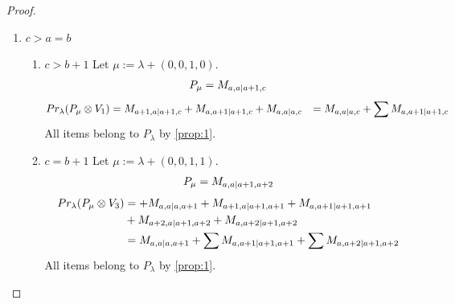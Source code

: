 \documentclass[12pt,a4paper]{article}
\begin{document}
\begin{proof}
\begin{enumerate}
\begin{enumerate}
    \item $a=b+1$
        Let $\mu:=\lambda + (1,1,0,0) $. 
\begin{equation}\notag
  \begin{aligned}
      P_{\mu} =
M_{b+2,b+1|b,c}
  \end{aligned}
\end{equation}
\begin{equation}\notag
  \begin{aligned}
  Pr_{\lambda}(P_\mu \otimes V_6) &=
M_{b+1,b|b,c}
+M_{b+1,b+1|b+1,c}
+M_{b+2,b+1|b+2,c}
  \end{aligned}
\end{equation}
All items belong to $P_\lambda$ by \cref{prop:1}.
  \end{enumerate}

\item $c>a=b$ 
  \begin{enumerate}
    \item $c>b+1$
        Let $\mu:=\lambda + (0,0,1,0) $. 
\begin{equation}\notag
  \begin{aligned}
      P_{\mu} =
M_{a,a|a+1,c}
  \end{aligned}
\end{equation}
\begin{equation}\notag
  \begin{aligned}
  Pr_{\lambda}(P_\mu \otimes V_1) &=
M_{a+1,a|a+1,c}
+M_{a,a+1|a+1,c}
+M_{a,a|a,c}
                                  &=
 M_{a,a|a,c}
+\sum M_{a,a+1|a+1,c}
  \end{aligned}
\end{equation}
All items belong to $P_\lambda$ by \cref{prop:1}.

    \item $c=b+1$
        Let $\mu:=\lambda + (0,0,1,1) $. 
\begin{equation}\notag
  \begin{aligned}
      P_{\mu} =
M_{a,a|a+1,a+2}
  \end{aligned}
\end{equation}
\begin{equation}\notag
  \begin{aligned}
  Pr_{\lambda}(P_\mu \otimes V_3) &=
+M_{a,a|a,a+1}
+M_{a+1,a|a+1,a+1}
+M_{a,a+1|a+1,a+1} \\
                                  &+
M_{a+2,a|a+1,a+2}
+M_{a,a+2|a+1,a+2} \\
                                  &=
M_{a,a|a,a+1}
+\sum M_{a,a+1|a+1,a+1}
+\sum M_{a,a+2|a+1,a+2}
  \end{aligned}
\end{equation}
All items belong to $P_\lambda$ by \cref{prop:1}.
  \end{enumerate}


\end{enumerate}
\end{proof}
\end{document}
